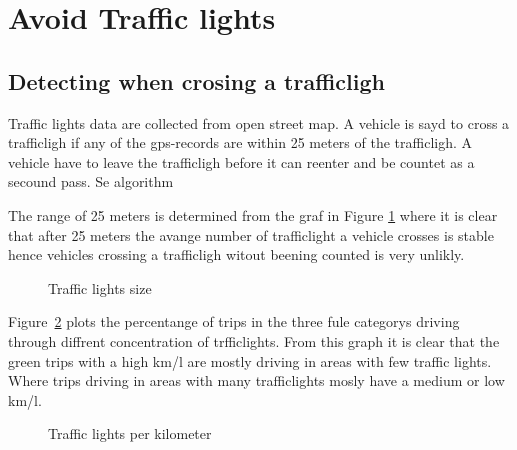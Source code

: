 \section{Avoid Traffic lights}

\subsection{Detecting when crosing a trafficligh}

Traffic lights data are collected from open street map. A vehicle is sayd to cross a trafficligh if any of the gps-records are within 25 meters of the trafficligh. A vehicle have to leave the trafficligh before it can reenter and be countet as a secound pass. Se algorithm %

The range of 25 meters is determined from the graf in Figure \ref{fig:traffclightsize} where it is clear that after 25 meters the avange number of trafficlight a vehicle crosses is stable hence vehicles crossing a trafficligh witout beening counted is very unlikly.


\begin{figure}[htb]
\centering
\caption{Traffic lights size}
\label{fig:traffclightsize}
\end{figure}


Figure~\ref{fig:traffclight} plots the percentange of trips in the three fule categorys driving through diffrent concentration of trfficlights. From this graph it is clear that the green trips with a high km/l are mostly driving in areas with few traffic lights. Where trips driving in areas with many trafficlights mosly have a medium or low km/l.


\begin{figure}[htb]%
\centering
\caption{Traffic lights per kilometer}
\label{fig:traffclight}
\end{figure}